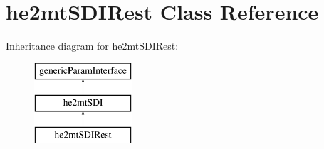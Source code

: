 \hypertarget{classhe2mt_s_d_i_rest}{\section{he2mt\-S\-D\-I\-Rest Class Reference}
\label{classhe2mt_s_d_i_rest}
}
Inheritance diagram for he2mt\-S\-D\-I\-Rest\-:\begin{figure}[H]
\begin{center}
\leavevmode
\includegraphics[height=3.000000cm]{classhe2mt_s_d_i_rest}
\end{center}
\end{figure}
